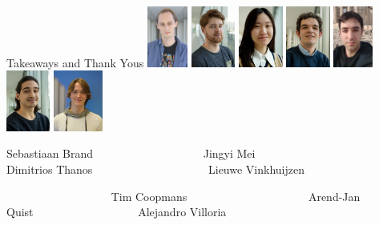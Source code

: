 \begin{refsection}
\begin{frame}{Takeaways and Thank Yous}
\includegraphics[height=2cm]{graphics/brand.png}
\includegraphics[height=2cm]{graphics/coopmans_tim}
\includegraphics[height=2cm]{graphics/mei.png}
\includegraphics[height=2cm]{graphics/quist_arend-jan.jpg}
\includegraphics[height=2cm]{graphics/dimitrios}
\includegraphics[height=2cm]{graphics/villoria_alejandro.jpg}
\includegraphics[height=2cm]{graphics/lieuwe.jpeg}

\footnotesize
Sebastiaan Brand~~~~~~~~~~~~~~~~~~~
Jingyi Mei~~~~~~~~~~~~~~~~~~~~~~~~~~ 
Dimitrios Thanos~~~~~~~~~~~~~~~~~~~~
Lieuwe Vinkhuijzen

\vspace{-2ex}
~~~~~~~~~~~~~~~~~~
Tim Coopmans~~~~~~~~~~~~~~~~~~~~~
Arend-Jan Quist~~~~~~~~~~~~~~~~~~
Alejandro Villoria



\end{frame}
\end{refsection}
